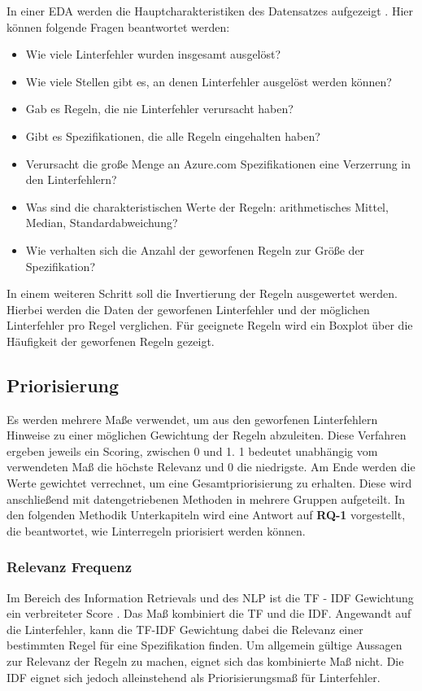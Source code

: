 In einer \acl{EDA} werden die Hauptcharakteristiken des Datensatzes aufgezeigt \parencite{tukey_exploratory_1977}. Hier können folgende Fragen beantwortet werden:

\begin{itemize}
  \item Wie viele Linterfehler wurden insgesamt ausgelöst?
  \item Wie viele Stellen gibt es, an denen Linterfehler ausgelöst werden können?
  \item Gab es Regeln, die nie Linterfehler verursacht haben?
  \item Gibt es Spezifikationen, die alle Regeln eingehalten haben?
  \item Verursacht die große Menge an Azure.com Spezifikationen eine Verzerrung in den Linterfehlern?
  \item Was sind die charakteristischen Werte der Regeln: arithmetisches Mittel, Median, Standardabweichung?
  \item Wie verhalten sich die Anzahl der geworfenen Regeln zur Größe der Spezifikation?
\end{itemize}

In einem weiteren Schritt soll die Invertierung der Regeln ausgewertet werden. Hierbei werden die Daten der geworfenen Linterfehler und der möglichen Linterfehler pro Regel verglichen. Für geeignete Regeln wird ein Boxplot über die Häufigkeit der geworfenen Regeln gezeigt.


\subsection{Priorisierung} \label{sec:methodpriorisierung}
Es werden mehrere Maße verwendet, um aus den geworfenen Linterfehlern Hinweise zu einer möglichen Gewichtung der Regeln abzuleiten. Diese Verfahren ergeben jeweils ein Scoring, zwischen 0 und 1. 1 bedeutet unabhängig vom verwendeten Maß die höchste Relevanz und 0 die niedrigste.  Am Ende werden die Werte gewichtet verrechnet, um eine Gesamtpriorisierung zu erhalten. Diese wird anschließend mit datengetriebenen Methoden in mehrere Gruppen aufgeteilt. In den folgenden Methodik Unterkapiteln wird eine Antwort auf \textbf{RQ-1} vorgestellt, die beantwortet, wie Linterregeln priorisiert werden können. 


\subsubsection{Relevanz Frequenz} \label{sec:inversedocumentfrequency}
Im Bereich des Information Retrievals und des \acs{NLP} ist die \acf{TF} - \acf{IDF} Gewichtung ein verbreiteter Score \parencite{manning_introduction_2008}. Das Maß kombiniert die \acl{TF} und die \acl{IDF}. Angewandt auf die Linterfehler, kann die \acs{TF}-\acs{IDF} Gewichtung dabei die Relevanz einer bestimmten Regel für eine Spezifikation finden. Um allgemein gültige Aussagen zur Relevanz der Regeln zu machen, eignet sich das kombinierte Maß nicht. Die \acl{IDF} eignet sich jedoch alleinstehend als Priorisierungsmaß für Linterfehler.

